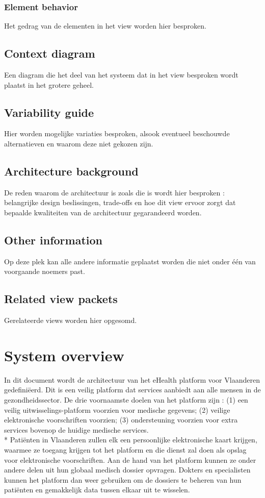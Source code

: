 \documentclass[a4paper,10pt]{article}
\begin{document}
\subsubsection*{Element behavior}
Het gedrag van de elementen in het view worden hier besproken.
\subsection{Context diagram}
Een diagram die het deel van het systeem dat in het view besproken wordt plaatst in het grotere geheel.
\subsection{Variability guide}
Hier worden mogelijke variaties besproken, alsook eventueel beschouwde alternatieven en waarom deze niet gekozen zijn.
\subsection{Architecture background}
De reden waarom de architectuur is zoals die is wordt hier besproken : belangrijke design beslissingen, trade-offs en hoe dit view ervoor zorgt dat bepaalde kwaliteiten van de architectuur gegarandeerd worden.
\subsection{Other information}
Op deze plek kan alle andere informatie geplaatst worden die niet onder één van voorgaande noemers past.
\subsection{Related view packets}
Gerelateerde views worden hier opgesomd.

\clearpage
\section{System overview}
In dit document wordt de architectuur van het eHealth platform voor Vlaanderen gedefiniëerd. Dit is een veilig platform dat services aanbiedt aan alle mensen in de gezondheidssector. De drie voornaamste doelen van het platform zijn : (1) een veilig uitwisselings-platform voorzien voor medische gegevens; (2) veilige elektronische voorschriften voorzien; (3) ondersteuning voorzien voor extra services bovenop de huidige medische services.\\*
Patiënten in Vlaanderen zullen elk een persoonlijke elektronische kaart krijgen, waarmee ze toegang krijgen tot het platform en die dienst zal doen als opslag voor elektronische voorschriften. Aan de hand van het platform kunnen ze onder andere delen uit hun globaal medisch dossier opvragen. Dokters en specialisten kunnen het platform dan weer gebruiken om de dossiers te beheren van hun patiënten en gemakkelijk data tussen elkaar uit te wisselen.
\end{document}
